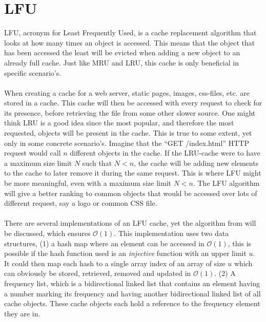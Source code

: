\documentclass[pdftex,a4paper,12pt,twoside]{report}
\begin{document}
\section{LFU}
\label{sec:LFU}
LFU, acronym for Least Frequently Used, is a cache replacement algorithm that looks at how many times an object is accessed. This means that the object that has been accessed the least will be evicted when adding a new object to an already full cache. Just like MRU and LRU, this cache is only beneficial in specific scenario's.
\\\\
When creating a cache for a web server, static pages, images, css-files, etc. are stored in a cache. This cache will then be accessed with every request to check for its presence, before retrieving the file from some other slower source. One might think LRU is a good idea since the most popular, and therefore the most requested, objects will be present in the cache. This is true to some extent, yet only in some concrete scenario's. Imagine that the ``GET /index.html'' HTTP request would call $n$ different objects in the cache. If the LRU-cache were to have a maximum size limit $N$ such that $N < n$, the cache will be adding new elements to the cache to later remove it during the same request. This is where LFU might be more meaningful, even with a maximum size limit $N < n$. The LFU algorithm will give a better ranking to common objects that would be accessed over lots of different request, say a logo or common CSS file.
\\\\
There are several implementations of an LFU cache, yet the algorithm from \cite{shah20101} will be discussed, which ensures $\mathcal{O}(1)$.
This implementation uses two data structures, (1) a hash map where an element can be accessed in $\mathcal{O}(1)$, this is possible if the hash function used is an 
\emph{injective} function with an upper limit $u$. It could then map each hash to a single array index of an array of size $u$ which can obviously be stored, retrieved, removed and updated in $\mathcal{O}(1)$. (2) A frequency list, which is a bidirectional linked list that contains an element having a number marking its frequency and having another bidirectional linked list of all cache objects. These cache objects each hold a reference to the frequency element they are in.
\end{document}

